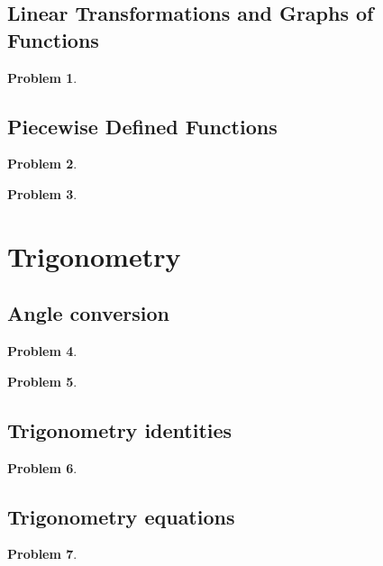 \documentclass{article}
\newtheorem{problem}{Problem}
\begin{document}
\subsection{Linear Transformations and Graphs of Functions}
\begin{problem}

\end{problem}
\subsection{Piecewise Defined Functions}
\begin{problem}

\end{problem}
\begin{problem}

\end{problem}

\section{Trigonometry}
\subsection{Angle conversion}
\begin{problem}

\end{problem}
\begin{problem}

\end{problem}
\subsection{Trigonometry identities}
\begin{problem}

\end{problem}

\subsection{Trigonometry equations}
\begin{problem}

\end{problem}

\end{document}

